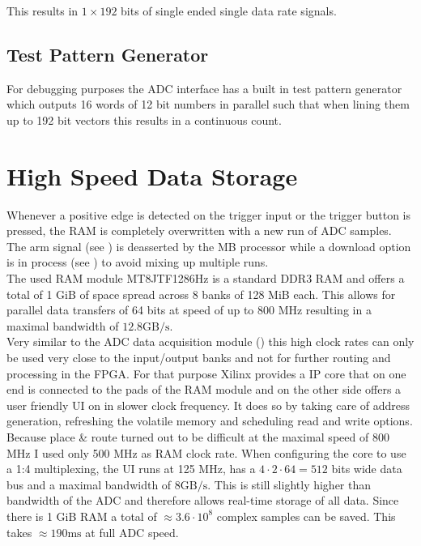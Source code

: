 This results in $1 \times 192$ bits of single ended single data rate signals. \\

\subsection{Test Pattern Generator}
For debugging purposes the \gls{ADC} interface has a built in test pattern
generator which outputs 16 words of 12 bit numbers in parallel such that
when lining them up to 192 bit vectors this results in a continuous count.

\section{High Speed Data Storage}
\label{sec:fpga_storage}
Whenever a positive edge is detected on the trigger input or the trigger
button is pressed, the \gls{RAM} is completely overwritten with a new run of
\gls{ADC} samples. \\

The arm signal (see ) is deasserted
by the \gls{MB} processor while a download option is in process
(see ) to avoid mixing up multiple runs. \\

The used \gls{RAM} module MT8JTF1286Hz is a standard \acrshort{DDR}3 \gls{RAM}
and offers a total of 1 GiB of space spread across 8 banks of 128 MiB each.
This allows for parallel data transfers of 64 bits at speed of up to 800 MHz
resulting in a maximal bandwidth of $12.8 \text{GB}/\text{s}$. \\

Very similar to the \gls{ADC} data acquisition module ()
this high clock rates can only be used very close to the input/output banks
and not for further routing and processing in the \gls{FPGA}.
For that purpose Xilinx provides a \gls{IP} core that on one end is connected
to the pads of the \gls{RAM} module and on the other side offers a user
friendly \gls{UI} on in slower clock frequency.
It does so by taking care of address generation, refreshing the volatile
memory and scheduling read and write options. \\

Because place \& route turned out to be difficult at the maximal speed
of 800 MHz I used only 500 MHz as \gls{RAM} clock rate.
When configuring the core to use a 1:4 multiplexing, the \gls{UI} runs
at 125 MHz, has a $4 \cdot 2 \cdot 64 = 512$ bits wide data bus
and a maximal bandwidth of $8 \text{GB}/\text{s}$. This is still slightly
higher than bandwidth of the \gls{ADC} and therefore allows real-time
storage of all data. Since there is 1 GiB \gls{RAM}
a total of $\approx 3.6 \cdot 10^8$ complex samples can be saved. This
takes $\approx 190 \text{ms}$ at full \gls{ADC} speed. \\


